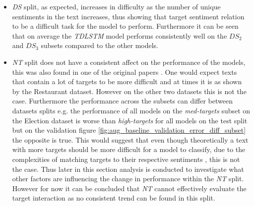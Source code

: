 \begin{itemize}
    \item \textit{DS} split, as expected, increases in difficulty as the number of unique sentiments in the text increases, thus showing that target sentiment relation to be a difficult task for the model to perform. Furthermore it can be seen that on average the \textit{TDLSTM} model performs consistently well on the $DS_2$ and $DS_3$ subsets compared to the other models.
    \item \textit{NT} split does not have a consistent affect on the performance of the models, this was also found in one of the original papers \citep{aug_zhang2019aspectbased}. One would expect texts that contain a lot of targets to be more difficult and at times it is as shown by the Restaurant dataset. However on the other two datasets this is not the case. Furthermore the performance across the subsets can differ between datasets splits e.g. the performance of all models on the \textit{med-targets} subset on the Election dataset is worse than \textit{high-targets} for all models on the test split but on the validation figure \ref{fig:aug_baseline_validation_error_diff_subset} the opposite is true. This would suggest that even though theoretically a text with more targets should be more difficult for a model to classify, due to the complexities of matching targets to their respective sentiments \citep{aug_zhang2019aspectbased}, this is not the case. Thus later in this section analysis is conducted to investigate what other factors are influencing the change in performance within the \textit{NT} split. However for now it can be concluded that \textit{NT} cannot effectively evaluate the target interaction as no consistent trend can be found in this split.

\end{itemize}
